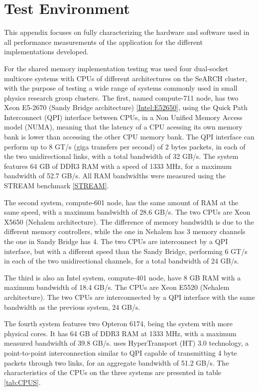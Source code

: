 \appendix
{}
\chapter{Test Environment}
\label{App:TestEnv}

This appendix focuses on fully characterizing the hardware and software used in all performance measurements of the application for the different implementations developed.

For the shared memory implementation testing was used four dual-socket multicore systems with CPUs of different architectures on the SeARCH cluster, with the purpose of testing a wide range of systems commonly used in small physics research group clusters. The first, named compute-711 node, has two \intel Xeon E5-2670 (Sandy Bridge architecture) \ref{Intel:E52650}, using the Quick Path Interconnect (QPI) interface between CPUs, in a Non Unified Memory Access model (NUMA), meaning that the latency of a CPU acessing its own memory bank is lower than accessing the other CPU memory bank. The QPI interface can perform up to 8 GT/s (giga transfers per second) of 2 bytes packets, in each of the two unidirectional links, with a total bandwidth of 32 GB/s. The system features 64 GB of DDR3 RAM with a speed of 1333 MHz, for a maximum bandwidth of 52.7 GB/s. All RAM bandwidths were measured using the STREAM benchmark \ref{STREAM}.

The second system, compute-601 node, has the same amount of RAM at the same speed, with a maximum bandwidth of 28.6 GB/s. The two CPUs are \intel Xeon X5650 (Nehalem architecture). The difference of memory bandwidth is due to the different memory controllers, while the one in Nehalem has 3 memory channels the one in Sandy Bridge has 4. The two CPUs are interconnect by a QPI interface, but with a different speed than the Sandy Bridge, performing 6 GT/s in each of the two unidirectional channels, for a total bandwidth of 24 GB/s.

The third is also an Intel system, compute-401 node, have 8 GB RAM with a maximum bandwidth of 18.4 GB/s. The CPUs are \intel Xeon E5520 (Nehalem architecture). The two CPUs are interconnected by a QPI interface with the same bandwidth as the previous system, 24 GB/s.

The fourth system features two \amd Opteron 6174, being the system with more physical cores. It has 64 GB of DDR3 RAM at 1333 MHz, with a maximum measured bandwidth of 39.8 GB/s. \amd uses HyperTransport (HT) 3.0 technology, a point-to-point interconnection similar to QPI capable of transmitting 4 byte packets through two links, for an aggregate bandwidth of 51.2 GB/s. The characteristics of the CPUs on the three systems are presented in table \ref{tab:CPUS}.

